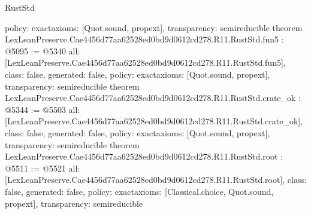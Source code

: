 \begin{lexlean}{RustStd}
\begin{coremodule}
{  policy: exact{axioms: [Quot.sound, propext]},
  transparency: semireducible
}
theorem LexLeanPreserve.Cae4456d77aa62528ed0bd9d0612cd278.R11.RustStd.fun5 : @5095 := @5340 {
  all: [LexLeanPreserve.Cae4456d77aa62528ed0bd9d0612cd278.R11.RustStd.fun5],
  class: false,
  generated: false,
  policy: exact{axioms: [Quot.sound, propext]},
  transparency: semireducible
}
theorem LexLeanPreserve.Cae4456d77aa62528ed0bd9d0612cd278.R11.RustStd.crate_ok : @5344 := @5503 {
  all: [LexLeanPreserve.Cae4456d77aa62528ed0bd9d0612cd278.R11.RustStd.crate_ok],
  class: false,
  generated: false,
  policy: exact{axioms: [Quot.sound, propext]},
  transparency: semireducible
}
theorem LexLeanPreserve.Cae4456d77aa62528ed0bd9d0612cd278.R11.RustStd.root : @5511 := @5521 {
  all: [LexLeanPreserve.Cae4456d77aa62528ed0bd9d0612cd278.R11.RustStd.root],
  class: false,
  generated: false,
  policy: exact{axioms: [Classical.choice, Quot.sound, propext]},
  transparency: semireducible
}


\end{coremodule}
\end{lexlean}

